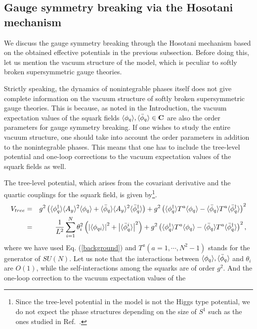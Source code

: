 \documentclass[a4paper,12pt]{article}
\begin{document}
\subsection{Gauge symmetry breaking via the Hosotani mechanism}
We discuss the gauge symmetry breaking through
the Hosotani mechanism based on the obtained effective potentials in the
previous subsection. Before doing this, let us mention 
the vacuum structure of the model, which is peculiar to softly broken
supersymmetric gauge theories. 
\par
Strictly speaking, the dynamics of nonintegrable phases
itself does not give complete information on the vacuum structure of 
softly broken supersymmetric gauge theories.
This is because, as noted in the Introduction, the vacuum 
expectation values of the squark fields $\langle \phi_q \rangle, \langle {\bar\phi}_q \rangle 
\in \rm {\bf C}$ are also the order parameters for gauge symmetry 
breaking. If one wishes to study the entire vacuum structure, one should 
take into account the order 
parameters in addition to the nonintegrable phases.
This means that one has to include the
tree-level potential and one-loop corrections to the vacuum
expectation values of the squark fields as well. 
\par
The tree-level potential, which arises from the covariant 
derivative and the quartic couplings for the squark field, is 
given by\footnote{Since the tree-level potential in the model 
is not the Higgs type potential, we do not expect the phase structures 
depending on the size of $S^1$ such as the ones studied 
in Ref.~\cite{sakamoto}.}.
\begin{eqnarray}
V_{tree}&=&g^2\left(\langle \phi_q^{\dagger} \rangle\langle A_y \rangle^2\langle \phi_q \rangle+
\langle {\bar\phi}_q \rangle\langle A_y \rangle^2\langle {\bar\phi}_q^{\dagger} \rangle\right)+g^2
\left(\langle \phi_q^{\dagger} \rangle T^a\langle \phi_q \rangle-\langle {\bar\phi_q} \rangle T^a
\langle {\bar\phi_q}^{\dagger} \rangle\right)^2
\nonumber\\
&=&{1\over L^2}
\sum_{i=1}^{N}\theta_i^2\left({\left|{\langle \phi_{qi} \rangle}\right|}^2
+{\left|{\langle {\bar\phi}^{i}_q \rangle}\right|}^2
\right)
+g^2\left(\langle \phi_q^{\dagger} \rangle T^a\langle \phi_q \rangle
-\langle {\bar\phi_q} \rangle T^a\langle {\bar\phi_q}^{\dagger} \rangle
\right)^2,
\end{eqnarray}
where we have used Eq. (\ref{background}) 
and $T^a (a=1,\cdots, N^2-1)$ stands for the 
generator of $SU(N)$. Let us note that the interactions between
$\langle \phi_q \rangle, \langle {\bar\phi}_q \rangle$ and $\theta_i$ are $O(1)$, while 
the self-interactions among the squarks
are of order $g^2$. And the one-loop 
correction to the vacuum expectation values of the 
\end{document}
